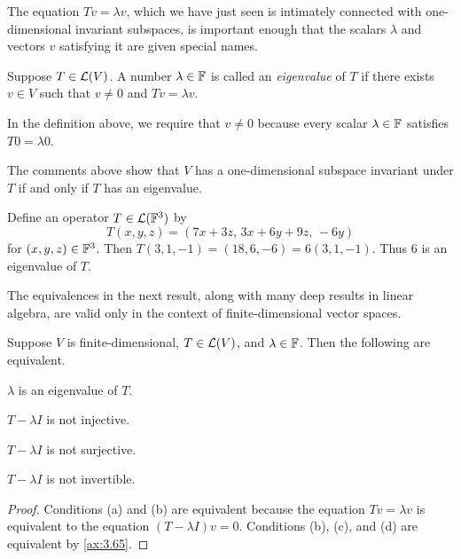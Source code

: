 The equation $Tv=\lambda v$, which we have just seen is intimately connected
with one-dimensional invariant subspaces, is important enough that the scalars
$\lambda$ and vectors $v$ satisfying it are given special names.

\begin{definition}[Eigenvalue]\label{ax:5.5}
Suppose $T\in\mathcal{L}(V)$. A number $\lambda\in\mathbb{F}$ is called an \emph{eigenvalue}
of $T$ if there exists $v\in V$ such that $v\ne0$ and $Tv=\lambda v$.
\end{definition}

%
In the definition above, we require that $v\ne0$ because every scalar
$\lambda\in\mathbb{F}$ satisfies $T0=\lambda0$.

The comments above show that $V$ has a one-dimensional subspace invariant under
$T$ if and only if $T$ has an eigenvalue.

\begin{example}[Eigenvalue]\label{ax:5.6}
Define an operator $T\in\mathcal{L}(\mathbb{F}^3)$ by
\[ T(x,y,z) = (7x+3z,\,3x+6y+9z,\,-6y) \]
for $(x,y,z)\in\mathbb{F}^3$. Then $T(3,1,-1)=(18,6,-6)=6(3,1,-1)$. Thus $6$ is an
eigenvalue of $T$.
\end{example}

%
The equivalences in the next result, along with many deep results in linear
algebra, are valid only in the context of finite-dimensional vector spaces.

\begin{result}\label{ax:5.7}
Suppose $V$ is finite-dimensional, $T\in\mathcal{L}(V)$, and $\lambda\in\mathbb{F}$. Then the
following are equivalent.
\begin{parts}
\item $\lambda$ is an eigenvalue of $T$.
\item $T-\lambda I$ is not injective.
\item $T-\lambda I$ is not surjective.
\item $T-\lambda I$ is not invertible.
\end{parts}
\end{result}

\begin{proof}
Conditions (a) and (b) are equivalent because the equation $Tv=\lambda v$ is
equivalent to the equation $(T-\lambda I)v=0$. Conditions (b), (c), and (d) are
equivalent by \ref{ax:3.65}.
\end{proof}

